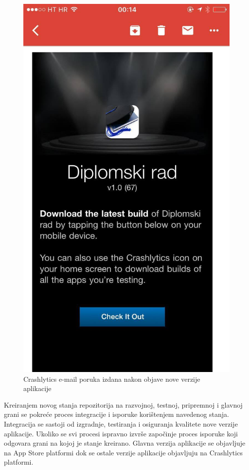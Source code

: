 \documentclass[times, utf8, diplomski, numeric]{fer}
\begin{document}
\begin{figure}[b!]
\centering
\includegraphics[scale=0.3]{CrashlyticsEmail}
\caption{Crashlytics e-mail poruka izdana nakon objave nove verzije aplikacije}
\label{fig:CrashlyticsEmail}
\end{figure}

Kreiranjem novog stanja repozitorija na razvojnoj, testnoj, pripremnoj i glavnoj grani se pokreće proces integracije i isporuke korištenjem navedenog stanja. Integracija se sastoji od izgradnje, testiranja i osiguranja kvalitete nove verzije aplikacije. Ukoliko se svi procesi ispravno izvrše započinje proces isporuke koji odgovara grani na kojoj je stanje kreirano. Glavna verzija aplikacije se objavljuje na App Store platformi dok se ostale verzije aplikacije objavljuju na Crashlytics platformi.
\end{document}
